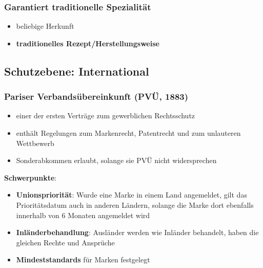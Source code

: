\documentclass[12pt,A4]{extarticle}
\newcommand{\highlight}[1]{\textcolor{highlightColor}{\textbf{#1}}}
\begin{document}
\subsubsection{Garantiert traditionelle Spezialität}
\begin{itemize}
  \item{beliebige Herkunft}
  \item{\textbf{traditionelles Rezept/Herstellungsweise}}
\end{itemize}

\subsection{Schutzebene: International}
\subsubsection{Pariser Verbandsübereinkunft (PVÜ, 1883)}
\begin{itemize}
  \item{einer der ersten Verträge zum gewerblichen Rechtsschutz}
  \item{enthält Regelungen zum Markenrecht, Patentrecht und zum unlauteren Wettbewerb}
  \item{Sonderabkommen erlaubt, solange sie PVÜ nicht widersprechen}
\end{itemize}
\textbf{Schwerpunkte}:
\begin{itemize}
  \item{\highlight{Unionspriorität}: Wurde eine Marke in einem Land angemeldet, gilt das Prioritätsdatum auch in anderen Ländern, solange die Marke dort ebenfalls innerhalb von 6 Monaten angemeldet wird}
  \item{\highlight{Inländerbehandlung}: Ausländer werden wie Inländer behandelt, haben die gleichen Rechte und Ansprüche}
  \item{\textbf{Mindeststandards} für Marken festgelegt}
\end{itemize}
\end{document}

